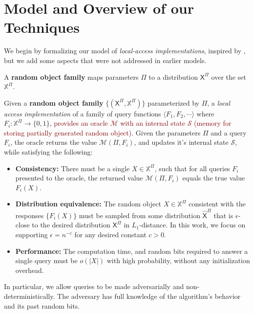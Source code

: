 \section{Model and Overview of our Techniques}
\label{sec:overview_of_our_techniques}
We begin by formalizing our model of \emph{local-access implementations}, inspired by \cite{reut},
but we add some aspects that were not addressed in earlier models.

\begin{definition}
\label{def:parametrized_random_object}
A \textbf{random object family} maps parameters $\Pi$ to a distribution $\mathsf X^{\Pi}$ over the set $\mathbb X^{\Pi}$.
\end{definition}

\begin{definition}
\label{def:local_access}
Given a \textbf{random object family} $\{(\mathsf X^{\Pi}, \mathbb X^{\Pi})\}$ parameterized by $\Pi$, a \emph{local access implementation}
of a family of query functions $\langle F_1, F_2,\cdots \rangle$ where $F_i: \mathbb X^{\Pi}\rightarrow \{0,1\}$,
\textcolor{Maroon}{provides an oracle $\mathcal M$ with an internal state $\mathcal S$ (memory for storing partially generated random object)}.
Given the parameters $\Pi$ and a query $F_i$, the oracle returns the value $\mathcal M(\Pi, F_i)$,
and updates it's internal state $\mathcal S$, while satisfying the following:
\begin{itemize}
    \item \textbf{Consistency:}
    There must be a single $X\in \mathbb X^{\Pi}$, such that for all queries $F_i$ presented to the oracle,
    the returned value $\mathcal M(\Pi,F_i)$ equals the true value $F_i(X)$.
    \item \textbf{Distribution equivalence:}
    The random object $X\in \mathbb X^{\Pi}$ consistent with the responses $\{ F_i(X)\}$ must be sampled from some distribution $\hat{\mathsf{X}}^{\Pi}$
    that is $\epsilon$-close to the desired distribution $\mathsf{X}^{\Pi}$ in $L_1$-distance.
    In this work, we focus on supporting $\epsilon = n^{-c}$ for any desired constant $c>0$.
    \item \textbf{Performance:}
    The computation time, and random bits required to answer a single query must be $o(|X|)$ with high probability,
    without any initialization overhead.
\end{itemize}
In particular, we allow queries to be made adversarially and non-deterministically.
The adversary has full knowledge of the algorithm's behavior and its past random bits.
\end{definition}

